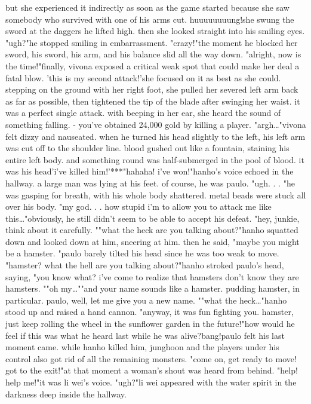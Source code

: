 but she experienced it indirectly as soon as the game started because she saw somebody who survived with one of his arms cut.
huuuuuuuung!she swung the sword at the daggers he lifted high.
 then she looked straight into his smiling eyes.
"ugh?"he stopped smiling in embarrassment.
"crazy!"the moment he blocked her sword, his sword, his arm, and his balance slid all the way down.
"alright, now is the time!"finally, vivona exposed a critical weak spot that could make her deal a fatal blow.
'this is my second attack!'she focused on it as best as she could.
 stepping on the ground with her right foot, she pulled her severed left arm back as far as possible, then tightened the tip of the blade after swinging her waist.
it was a perfect single attack.
with beeping in her ear, she heard the sound of something falling.
- you've obtained 24,000 gold by killing a player.
"argh…"vivona felt dizzy and nauseated.
 when he turned his head slightly to the left, his left arm was cut off to the shoulder line.
 blood gushed out like a fountain, staining his entire left body.
 and something round was half-submerged in the pool of blood.
 it was his head'i've killed him!'***"hahaha! i've won!"hanho's voice echoed in the hallway.
 a large man was lying at his feet.
 of course, he was paulo.
"ugh.
.
.
"he was gasping for breath, with his whole body shattered.
 metal beads were stuck all over his body.
"my god.
.
.
how stupid i'm to allow you to attack me like this…"obviously, he still didn't seem to be able to accept his defeat.
"hey, junkie, think about it carefully.
""what the heck are you talking about?"hanho squatted down and looked down at him, sneering at him.
then he said, "maybe you might be a hamster.
"paulo barely tilted his head since he was too weak to move.
"hamster? what the hell are you talking about?"hanho stroked paulo's head, saying, "you know what? i've come to realize that hamsters don't know they are hamsters.
""oh my…""and your name sounds like a hamster.
 pudding hamster, in particular.
 paulo, well, let me give you a new name.
""what the heck…"hanho stood up and raised a hand cannon.
"anyway, it was fun fighting you.
 hamster, just keep rolling the wheel in the sunflower garden in the future!"how would he feel if this was what he heard last while he was alive?bang!paulo felt his last moment came.
while hanho killed him, junghoon and the players under his control also got rid of all the remaining monsters.
"come on, get ready to move! got to the exit!"at that moment a woman's shout was heard from behind.
"help! help me!"it was li wei's voice.
"ugh?"li wei appeared with the water spirit in the darkness deep inside the hallway.



